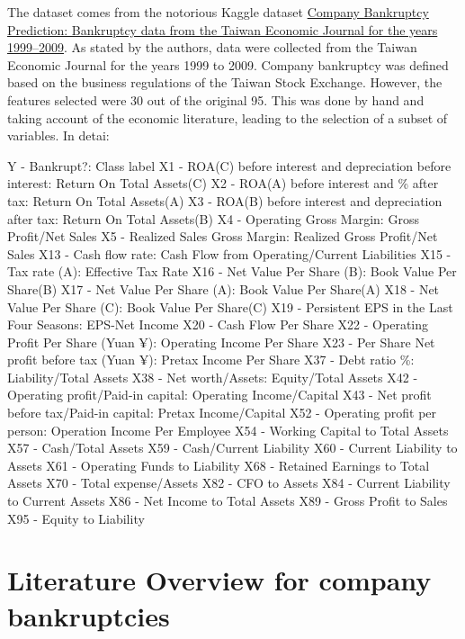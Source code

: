 \documentclass[
]{article}
\begin{document}
The dataset comes from the notorious Kaggle dataset
\href{https://www.kaggle.com/datasets/fedesoriano/company-bankruptcy-prediction}{Company
Bankruptcy Prediction: Bankruptcy data from the Taiwan Economic Journal
for the years 1999--2009}. As stated by the authors, data were collected
from the Taiwan Economic Journal for the years 1999 to 2009. Company
bankruptcy was defined based on the business regulations of the Taiwan
Stock Exchange. However, the features selected were 30 out of the
original 95. This was done by hand and taking account of the economic
literature, leading to the selection of a subset of variables. In detai:

Y - Bankrupt?: Class label X1 - ROA(C) before interest and depreciation
before interest: Return On Total Assets(C) X2 - ROA(A) before interest
and \% after tax: Return On Total Assets(A) X3 - ROA(B) before interest
and depreciation after tax: Return On Total Assets(B) X4 - Operating
Gross Margin: Gross Profit/Net Sales X5 - Realized Sales Gross Margin:
Realized Gross Profit/Net Sales X13 - Cash flow rate: Cash Flow from
Operating/Current Liabilities X15 - Tax rate (A): Effective Tax Rate X16
- Net Value Per Share (B): Book Value Per Share(B) X17 - Net Value Per
Share (A): Book Value Per Share(A) X18 - Net Value Per Share (C): Book
Value Per Share(C) X19 - Persistent EPS in the Last Four Seasons:
EPS-Net Income X20 - Cash Flow Per Share X22 - Operating Profit Per
Share (Yuan ¥): Operating Income Per Share X23 - Per Share Net profit
before tax (Yuan ¥): Pretax Income Per Share X37 - Debt ratio \%:
Liability/Total Assets X38 - Net worth/Assets: Equity/Total Assets X42 -
Operating profit/Paid-in capital: Operating Income/Capital X43 - Net
profit before tax/Paid-in capital: Pretax Income/Capital X52 - Operating
profit per person: Operation Income Per Employee X54 - Working Capital
to Total Assets X57 - Cash/Total Assets X59 - Cash/Current Liability X60
- Current Liability to Assets X61 - Operating Funds to Liability X68 -
Retained Earnings to Total Assets X70 - Total expense/Assets X82 - CFO
to Assets X84 - Current Liability to Current Assets X86 - Net Income to
Total Assets X89 - Gross Profit to Sales X95 - Equity to Liability

\hypertarget{literature-overview-for-company-bankruptcies}{%
\section{Literature Overview for company
bankruptcies}\label{literature-overview-for-company-bankruptcies}}
\end{document}
